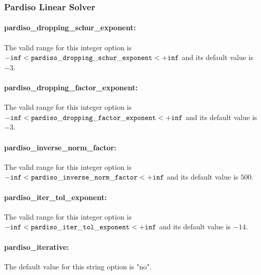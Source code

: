 \subsubsection{Pardiso Linear Solver}
\label{sec:Pardiso_Linear_Solver}

\paragraph{pardiso\_dropping\_schur\_exponent:}\label{sec:pardiso_dropping_schur_exponent}  $\;$ \\
 The valid range for this integer option is
${\tt -inf} <  {\tt pardiso\_dropping\_schur\_exponent } <  {\tt +inf}$
and its default value is $-3$.

\paragraph{pardiso\_dropping\_factor\_exponent:}\label{sec:pardiso_dropping_factor_exponent}  $\;$ \\
 The valid range for this integer option is
${\tt -inf} <  {\tt pardiso\_dropping\_factor\_exponent } <  {\tt +inf}$
and its default value is $-3$.

\paragraph{pardiso\_inverse\_norm\_factor:}\label{sec:pardiso_inverse_norm_factor}  $\;$ \\
 The valid range for this integer option is
${\tt -inf} <  {\tt pardiso\_inverse\_norm\_factor } <  {\tt +inf}$
and its default value is $500$.

\paragraph{pardiso\_iter\_tol\_exponent:}\label{sec:pardiso_iter_tol_exponent}  $\;$ \\
 The valid range for this integer option is
${\tt -inf} <  {\tt pardiso\_iter\_tol\_exponent } <  {\tt +inf}$
and its default value is $-14$.

\paragraph{pardiso\_iterative:}\label{sec:pardiso_iterative}  $\;$ \\
The default value for this string option is "no".

